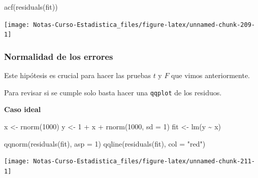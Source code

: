 \documentclass[
  12pt,
]{book}
\newenvironment{Shaded}{\begin{snugshade}}{\end{snugshade}}
\newcommand{\AttributeTok}[1]{\textcolor[rgb]{0.77,0.63,0.00}{#1}}
\newcommand{\DecValTok}[1]{\textcolor[rgb]{0.00,0.00,0.81}{#1}}
\newcommand{\FunctionTok}[1]{\textcolor[rgb]{0.00,0.00,0.00}{#1}}
\newcommand{\NormalTok}[1]{#1}
\newcommand{\OtherTok}[1]{\textcolor[rgb]{0.56,0.35,0.01}{#1}}
\newcommand{\SpecialCharTok}[1]{\textcolor[rgb]{0.00,0.00,0.00}{#1}}
\newcommand{\StringTok}[1]{\textcolor[rgb]{0.31,0.60,0.02}{#1}}
\theoremstyle{definition}
\theoremstyle{definition}
\theoremstyle{definition}
\theoremstyle{remark}
\begin{document}
\begin{Shaded}
\begin{Highlighting}[]
\FunctionTok{acf}\NormalTok{(}\FunctionTok{residuals}\NormalTok{(fit))}
\end{Highlighting}
\end{Shaded}

\begin{center}\texttt{[image: Notas-Curso-Estadistica\_files/figure-latex/unnamed-chunk-209-1]} \end{center}

\hypertarget{normalidad-de-los-errores}{%
\subsubsection{Normalidad de los errores}\label{normalidad-de-los-errores}}

Este hipótesis es crucial para hacer las pruebas \(t\) y \(F\) que vimos anteriormente.

Para revisar si se cumple solo basta hacer una \texttt{qqplot} de los residuos.

\textbf{Caso ideal}

\begin{Shaded}
\begin{Highlighting}[]
\NormalTok{x }\OtherTok{\textless{}{-}} \FunctionTok{rnorm}\NormalTok{(}\DecValTok{1000}\NormalTok{)}
\NormalTok{y }\OtherTok{\textless{}{-}} \DecValTok{1} \SpecialCharTok{+}\NormalTok{ x }\SpecialCharTok{+} \FunctionTok{rnorm}\NormalTok{(}\DecValTok{1000}\NormalTok{, }\AttributeTok{sd =} \DecValTok{1}\NormalTok{)}
\NormalTok{fit }\OtherTok{\textless{}{-}} \FunctionTok{lm}\NormalTok{(y }\SpecialCharTok{\textasciitilde{}}\NormalTok{ x)}
\end{Highlighting}
\end{Shaded}

\begin{Shaded}
\begin{Highlighting}[]
\FunctionTok{qqnorm}\NormalTok{(}\FunctionTok{residuals}\NormalTok{(fit), }\AttributeTok{asp =} \DecValTok{1}\NormalTok{)}
\FunctionTok{qqline}\NormalTok{(}\FunctionTok{residuals}\NormalTok{(fit), }\AttributeTok{col =} \StringTok{"red"}\NormalTok{)}
\end{Highlighting}
\end{Shaded}

\begin{center}\texttt{[image: Notas-Curso-Estadistica\_files/figure-latex/unnamed-chunk-211-1]} \end{center}
\end{document}
